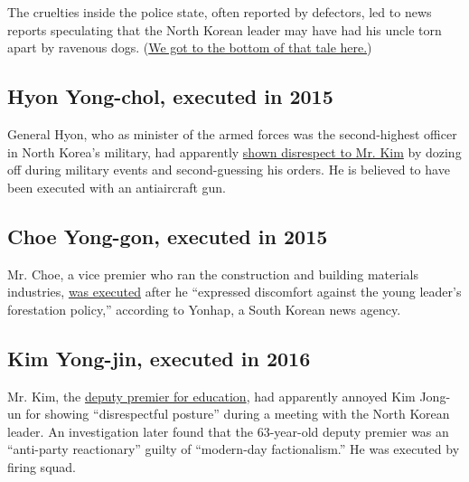 The cruelties inside the police state, often reported by defectors, led
to news reports speculating that the North Korean leader may have had
his uncle torn apart by ravenous dogs.
(\href{https://thelede.blogs.nytimes3xbfgragh.onion/2014/01/03/inside-the-tale-of-north-korea-execution-by-ravenous-dog/}{We
got to the bottom of that tale here.})

\hypertarget{hyon-yong-chol-executed-in-2015}{%
\subsection{\texorpdfstring{\textbf{Hyon Yong-chol, executed in
2015}}{Hyon Yong-chol, executed in 2015}}\label{hyon-yong-chol-executed-in-2015}}

General Hyon, who as minister of the armed forces was the second-highest
officer in North Korea's military, had apparently
\href{https://www.nytimes3xbfgragh.onion/2015/05/13/world/asia/north-korea-said-to-execute-a-top-official.html}{shown
disrespect to Mr. Kim} by dozing off during military events and
second-guessing his orders. He is believed to have been executed with an
antiaircraft gun.

\hypertarget{choe-yong-gon-executed-in-2015}{%
\subsection{\texorpdfstring{\textbf{Choe Yong-gon, executed in
2015}}{Choe Yong-gon, executed in 2015}}\label{choe-yong-gon-executed-in-2015}}

Mr. Choe, a vice premier who ran the construction and building materials
industries, \href{http://www.bbc.com/news/world-asia-33882799}{was
executed} after he ``expressed discomfort against the young leader's
forestation policy,'' according to Yonhap, a South Korean news agency.

\hypertarget{kim-yong-jin-executed-in-2016}{%
\subsection{\texorpdfstring{\textbf{Kim Yong-jin, executed in
2016}}{Kim Yong-jin, executed in 2016}}\label{kim-yong-jin-executed-in-2016}}

Mr. Kim, the
\href{https://www.nytimes3xbfgragh.onion/2016/09/01/world/asia/north-korea-executes-deputy-premier.html}{deputy
premier for education}, had apparently annoyed Kim Jong-un for showing
``disrespectful posture'' during a meeting with the North Korean leader.
An investigation later found that the 63-year-old deputy premier was an
``anti-party reactionary'' guilty of ``modern-day factionalism.'' He was
executed by firing squad.

